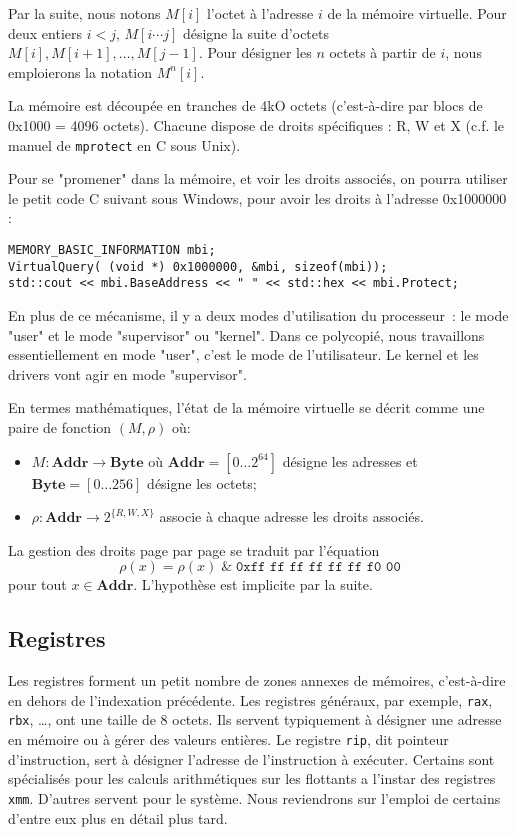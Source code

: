 \documentclass{book}
\newcommand{\C}{\textsc{C}\xspace}
\newcommand{\code}[1]{\texttt{#1}}
\newcommand{\rip}{{\tt rip}\xspace}
\newcommand{\rax}{{\tt rax}\xspace}
\newcommand{\rbx}{{\tt rbx}\xspace}
\newcommand{\Byte}{{\mathbf{Byte}}}
\newcommand{\Addr}{{\mathbf{Addr}}}
\begin{document}
{ Par la suite, nous notons $M[i]$ l'octet à l'adresse $i$ de la mémoire virtuelle. Pour deux entiers $i < j$, $M[i \cdots j]$ désigne la suite d'octets $M[i], M[i+1], \ldots, M[j-1]$. Pour désigner les $n$ octets à partir de $i$, nous  emploierons la notation $M^n[i]$. 

La mémoire est découpée en tranches de 4kO octets (c'est-à-dire par blocs de 0x1000 = 4096 octets). Chacune dispose de droits spécifiques : R, W et X (c.f. le manuel de {\tt mprotect} en \C sous Unix). 

Pour se "promener" dans la mémoire, et voir les droits associés, on pourra utiliser le petit code \C suivant sous Windows, pour avoir les droits à l'adresse 0x1000000 :
\begin{verbatim}
MEMORY_BASIC_INFORMATION mbi;
VirtualQuery( (void *) 0x1000000, &mbi, sizeof(mbi));
std::cout << mbi.BaseAddress << " " << std::hex << mbi.Protect;
\end{verbatim}

En plus de ce mécanisme, il y a deux modes d'utilisation du processeur~: le mode "user" et le mode "supervisor" ou "kernel". Dans ce polycopié, nous travaillons essentiellement en mode "user", c'est le mode de l'utilisateur. Le kernel et les drivers vont agir en mode "supervisor". 

En termes mathématiques, l'état de la mémoire virtuelle se décrit comme une paire de fonction $(M,\rho)$ où:
\begin{itemize}
	\item $M : \Addr \to \Byte$ où $\Addr = [0\ldots 2^{64}]$ désigne les adresses et $\Byte = [0\ldots 256]$ désigne les octets;
	\item $\rho: \Addr \to 2^{\{R, W, X\}}$ associe à chaque adresse les droits associés. 
\end{itemize}

La gestion des droits page par page se traduit par l'équation $$\rho(x) = \rho(x)\; \& \; \code{0xff ff ff ff ff ff f0 00}$$ pour tout $x\in \Addr$. L'hypothèse est implicite par la suite. 

\subsection{Registres}
Les registres forment un petit nombre de zones annexes de mémoires, c'est-à-dire en dehors  de l'indexation précédente. Les registres généraux, par exemple, \rax, \rbx, \ldots, ont une taille de 8 octets. Ils servent typiquement à désigner une adresse en mémoire ou à gérer des valeurs entières. Le registre \rip, dit pointeur d'instruction, sert à désigner l'adresse de l'instruction à exécuter. Certains sont spécialisés pour les calculs arithmétiques sur les flottants a l'instar des registres {\tt xmm}. D'autres servent pour le système. Nous reviendrons sur l'emploi de certains d'entre eux plus en détail plus tard.

}
\end{document}

